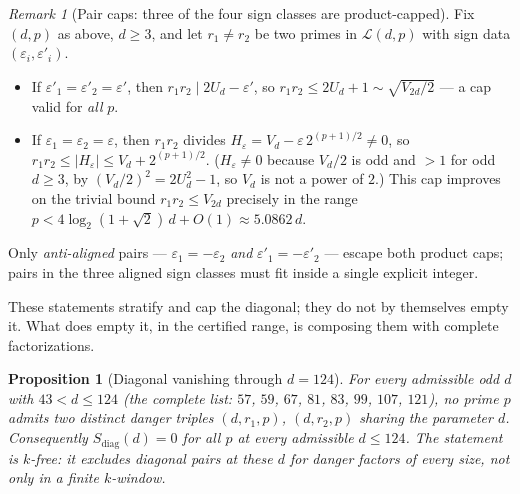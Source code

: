 \documentclass[11pt]{amsart}
\theoremstyle{plain}
\newtheorem{proposition}[theorem]{Proposition}
\theoremstyle{definition}
\theoremstyle{remark}
\newtheorem{remark}[theorem]{Remark}
\numberwithin{equation}{section}
\begin{document}
\begin{remark}[Pair caps: three of the four sign classes are product-capped]\label{rem:pair-caps}
Fix $(d, p)$ as above, $d \geq 3$, and let $r_1 \neq r_2$ be two primes in $\mathcal{L}(d, p)$ with sign data $(\varepsilon_i, \varepsilon'_i)$.
\begin{itemize}
\item If $\varepsilon'_1 = \varepsilon'_2 = \varepsilon'$, then $r_1 r_2 \mid 2 U_d - \varepsilon'$, so $r_1 r_2 \leq 2 U_d + 1 \sim \sqrt{V_{2 d}/2}$ --- a cap valid for \emph{all} $p$.
\item If $\varepsilon_1 = \varepsilon_2 = \varepsilon$, then $r_1 r_2$ divides $H_\varepsilon = V_d - \varepsilon\, 2^{(p+1)/2} \neq 0$, so $r_1 r_2 \leq |H_\varepsilon| \leq V_d + 2^{(p+1)/2}$. ($H_\varepsilon \neq 0$ because $V_d/2$ is odd and $> 1$ for odd $d \geq 3$, by $(V_d/2)^2 = 2 U_d^2 - 1$, so $V_d$ is not a power of $2$.) This cap improves on the trivial bound $r_1 r_2 \leq V_{2 d}$ precisely in the range $p < 4 \log_2(1 + \sqrt 2)\, d + O(1) \approx 5.0862\, d$.
\end{itemize}
Only \emph{anti-aligned} pairs --- $\varepsilon_1 = -\varepsilon_2$ \emph{and} $\varepsilon'_1 = -\varepsilon'_2$ --- escape both product caps; pairs in the three aligned sign classes must fit inside a single explicit integer.
\end{remark}

These statements stratify and cap the diagonal; they do not by themselves empty it. What does empty it, in the certified range, is composing them with complete factorizations.

\begin{proposition}[Diagonal vanishing through $d = 124$]\label{prop:diagonal-closures}
For every admissible odd $d$ with $43 < d \leq 124$ (the complete list: $57$, $59$, $67$, $81$, $83$, $99$, $107$, $121$), no prime $p$ admits two distinct danger triples $(d, r_1, p)$, $(d, r_2, p)$ sharing the parameter $d$. Consequently $S_{\mathrm{diag}}(d) = 0$ for all $p$ at every admissible $d \leq 124$. The statement is $k$-free: it excludes diagonal pairs at these $d$ for danger factors of every size, not only in a finite $k$-window.
\end{proposition}
\end{document}
